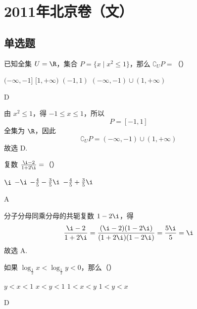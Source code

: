 \chapter{2011年北京卷（文）}

\section{单选题}

\begin{problem}
已知全集 \(U = \R\)，集合 \(P = \{x \mid x^2 \leqslant 1\}\)，那么 \(\complement_U P =\)（\quad）

\choices
    {\((-\infty, -1]\)}
    {\([1, +\infty)\)}
    {\((-1, 1)\)}
    {\((-\infty, -1) \cup (1, +\infty)\)}
\end{problem}

\begin{answer}
D
\end{answer}

\begin{solution}
由 \(x^{2}\leqslant 1\)，得 \(-1\leqslant x\leqslant 1\)，所以
\[
P=[-1,1]
\]
全集为 \(\R\)，因此
\[
\complement_U P=(-\infty,-1)\cup(1,+\infty)
\]
故选 D.
\end{solution}

\begin{problem}
复数 \(\frac{\i - 2}{1 + 2\i} =\)（\quad）

\choices
    {\(\i\)}
    {\(-\i\)}
    {\(-\frac{4}{5} - \frac{3}{5}\i\)}
    {\(-\frac{4}{5} + \frac{3}{5}\i\)}
\end{problem}

\begin{answer}
A
\end{answer}

\begin{solution}
分子分母同乘分母的共轭复数 \(1-2\i\)，得
\[
\frac{\i-2}{1+2\i}
=\frac{(\i-2)(1-2\i)}{(1+2\i)(1-2\i)}
=\frac{5\i}{5}
=\i
\]
故选 A.
\end{solution}

\begin{problem}
如果 \(\log_{\frac{1}{2}} x < \log_{\frac{1}{2}} y < 0\)，那么（\quad）

\choices
    {\(y < x < 1\)}
    {\(x < y < 1\)}
    {\(1 < x < y\)}
    {\(1 < y < x\)}
\end{problem}

\begin{answer}
D
\end{answer}

